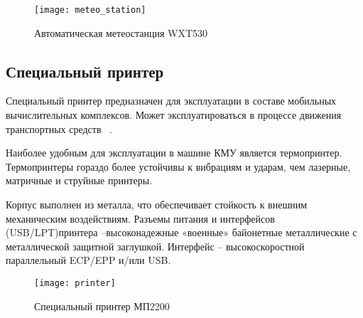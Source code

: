 \begin{figure}[ht]
	\centering
	\texttt{[image: meteo\_station]}
	\caption{Автоматическая метеостанция WXT530~\cite{wxt530}}
	\label{fig:lit_reiview:meteo:meteo_station}
\end{figure}

\subsection{Специальный принтер}
\label{sub:lit_review:spec_printer}
Специальный принтер предназначен для эксплуатации в составе мобильных вычислительных комплексов.
Может эксплуатироваться в процессе движения транспортных средств ~\cite{mp2200}.

Наиболее удобным для эксплуатации в машине КМУ является термопринтер. Термопринтеры гораздо более устойчивы к вибрациям и ударам, чем лазерные, матричные и струйные принтеры.

Корпус выполнен из металла, что обеспечивает стойкость к внешним механическим воздействиям.
Разъемы питания и интерфейсов (USB/LPT)\break принтера –высоконадежные «военные» байонетные металлические с металлической защитной заглушкой.
Интерфейс – высокоскоростной параллельный ECP/EPP и/или USB.

\begin{figure}[ht]
	\centering
	\texttt{[image: printer]}
	\caption{Специальный принтер МП2200~\cite{mp2200}}
	\label{fig:lit_reiview:spec_printer:printer}
\end{figure}

